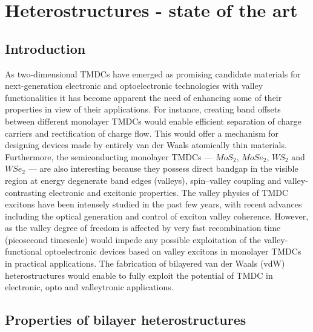 \chapter{Heterostructures - state of the art}

\section{Introduction}

As two-dimensional TMDCs have emerged as promising candidate materials for next-generation electronic and optoelectronic technologies with valley functionalities it has become apparent the need of enhancing some of their properties in view of their applications. For instance, creating band offsets between different monolayer TMDCs would enable efficient separation of charge carriers and rectification of charge flow. This would offer a mechanism for designing devices made by entirely van der Waals atomically thin materials.  Furthermore, the semiconducting monolayer TMDCs — $MoS_2$, $MoSe_2$, $WS_2$ and $WSe_2$ — are also interesting because they possess direct bandgap in the visible region at energy degenerate band edges (valleys), spin–valley coupling and valley-contrasting electronic and excitonic properties.
 The valley physics of TMDC excitons have been intensely studied in the past few years, with recent advances including the optical generation and control of exciton valley coherence. However, as the valley degree of freedom is affected by very fast recombination time (picosecond timescale) would impede any possible exploitation of the valley-functional optoelectronic devices based on valley excitons in monolayer TMDCs in practical applications. The fabrication of bilayered van der Waals (vdW) heterostructures would enable to fully exploit the potential of TMDC in electronic, opto and valleytronic applications.

\section{Properties of bilayer heterostructures}

